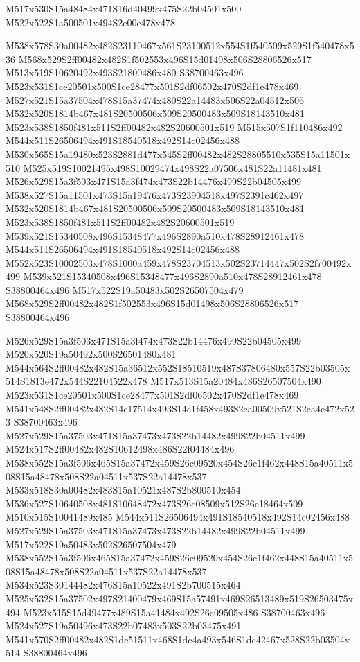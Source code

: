 \documentclass{article}
\begin{document}
\begin{multicols}{2}
\begin{center}
M517x530S15a48484x471S16d40499x475S22b04501x500 M522x522S1a500501x494S2e00e478x478 
\end{center}


M538x578S30a00482x482S23110467x561S23100512x554S1f540509x529S1f540478x536 M568x529S2ff00482x482S1f502553x496S15d01498x506S28806526x517 M513x519S10620492x493S21800486x480 S38700463x496 M523x531S1ce20501x500S1ce28477x501S2df06502x470S2df1e478x469 M527x521S15a37504x478S15a37474x480S22a14483x506S22a04512x506 M532x520S1814b467x481S20500506x509S20500483x509S18143510x481 M523x538S1850f481x511S2ff00482x482S20600501x519 M515x507S1f110486x492 M544x511S26506494x491S18540518x492S14c02456x488 M530x565S15a19480x523S2881d477x545S2ff00482x482S28805510x535S15a11501x510 M525x519S10021495x498S10029474x498S22a07506x481S22a11481x481 M526x529S15a3f503x471S15a3f474x473S22b14476x499S22b04505x499 M538x527S15a11501x473S15a19476x473S23904518x497S2391c462x497 M532x520S1814b467x481S20500506x509S20500483x509S18143510x481 M523x538S1850f481x511S2ff00482x482S20600501x519 M539x521S15340508x496S15348477x496S2890a510x478S28912461x478 M544x511S26506494x491S18540518x492S14c02456x488 M552x523S10002503x478S1000a459x478S23704513x502S23714447x502S2f700492x499 M539x521S15340508x496S15348477x496S2890a510x478S28912461x478 S38800464x496 M517x522S19a50483x502S26507504x479 M568x529S2ff00482x482S1f502553x496S15d01498x506S28806526x517 S38800464x496

M526x529S15a3f503x471S15a3f474x473S22b14476x499S22b04505x499 M520x520S19a50492x500S26501480x481 M544x564S2ff00482x482S15a36512x552S18510519x487S37806480x557S22b03505x514S1813e472x544S22104522x478 M517x513S15a20484x486S26507504x490 M523x531S1ce20501x500S1ce28477x501S2df06502x470S2df1e478x469 M541x548S2ff00482x482S14c17514x493S14c1f458x493S2ea00509x521S2ea4c472x523 S38700463x496 M527x529S15a37503x471S15a37473x473S22b14482x499S22b04511x499 M524x517S2ff00482x482S10612498x486S22f04484x496 M538x552S15a3f506x465S15a37472x459S26c09520x454S26c1f462x448S15a40511x508S15a48478x508S22a04511x537S22a14478x537 M533x518S30a00482x483S15a10521x487S2b800510x454 M536x527S10640508x481S10648472x473S26c08509x512S26c18464x509 M510x515S10041489x485 M544x511S26506494x491S18540518x492S14c02456x488 M527x529S15a37503x471S15a37473x473S22b14482x499S22b04511x499 M517x522S19a50483x502S26507504x479 M538x552S15a3f506x465S15a37472x459S26c09520x454S26c1f462x448S15a40511x508S15a48478x508S22a04511x537S22a14478x537 M534x523S30144482x476S15a10522x491S2b700515x464 M525x532S15a37502x497S21400479x469S15a57491x469S26513489x519S26503475x494 M523x515S15d49477x489S15a41484x492S26c09505x486 S38700463x496 M524x527S19a50496x473S22b07483x503S22b03475x491 M541x570S2ff00482x482S1dc51511x468S1dc4a493x546S1dc42467x528S22b03504x514 S38800464x496


\end{multicols}
\end{document}
